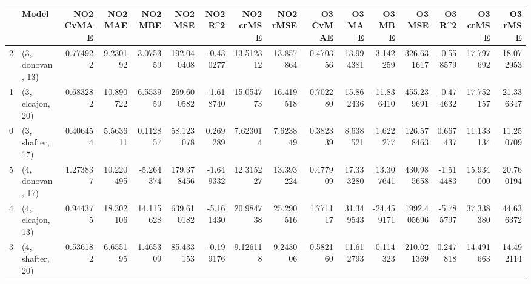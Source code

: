\begin{tabular}{llrrrrrrrrrrrrrr}
\toprule
{} &             Model &  NO2 CvMAE &    NO2 MAE &    NO2 MBE &     NO2 MSE &   NO2 R\textasciicircum2 &  NO2 crMSE &   NO2 rMSE &  O3 CvMAE &     O3 MAE &     O3 MBE &       O3 MSE &    O3 R\textasciicircum2 &   O3 crMSE &    O3 rMSE \\
\midrule
2 &  (3, donovan, 13) &   0.774922 &   9.230192 &   3.075359 &  192.040408 & -0.430277 &  13.512312 &  13.857864 &  0.470356 &  13.994381 &   3.142259 &   326.631617 & -0.558579 &  17.797692 &  18.072953 \\
1 &  (3, elcajon, 20) &   0.683282 &  10.890722 &   6.553959 &  269.600582 & -1.618740 &  15.054773 &  16.419518 &  0.702280 &  15.862436 & -11.836410 &   455.239691 & -0.474632 &  17.752157 &  21.336347 \\
0 &  (3, shafter, 17) &   0.406454 &   5.563611 &   0.112857 &   58.123078 &  0.269289 &   7.623014 &   7.623849 &  0.382339 &   8.638521 &   1.622277 &   126.578463 &  0.667437 &  11.133134 &  11.250709 \\
5 &  (4, donovan, 17) &   1.273837 &  10.220495 &  -5.264374 &  179.378456 & -1.649332 &  12.315227 &  13.393224 &  0.477909 &  17.333280 &  13.307641 &   430.985658 & -1.514483 &  15.934000 &  20.760194 \\
4 &  (4, elcajon, 13) &   0.944375 &  18.302106 &  14.115628 &  639.610182 & -5.161430 &  20.984738 &  25.290516 &  1.771117 &  31.349543 & -24.459171 &  1992.405696 & -5.785797 &  37.338380 &  44.636372 \\
3 &  (4, shafter, 20) &   0.536182 &   6.655195 &   1.465309 &   85.433153 & -0.199176 &   9.126118 &   9.243006 &  0.582160 &  11.612793 &   0.114323 &   210.021369 &  0.247818 &  14.491663 &  14.492114 \\
\bottomrule
\end{tabular}
